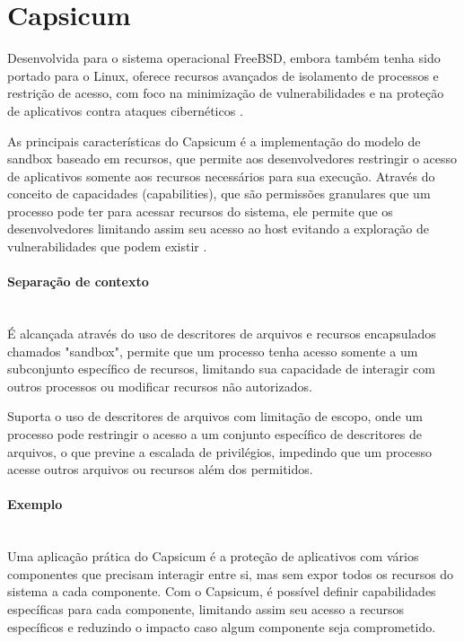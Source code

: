 \section{Capsicum}

Desenvolvida para o sistema operacional FreeBSD, embora também tenha sido portado para o Linux, oferece recursos avançados de isolamento de processos e restrição de acesso, com foco na minimização de vulnerabilidades e na proteção de aplicativos contra ataques cibernéticos \cite{freebsd-capsicum}.

As principais características do Capsicum é a implementação do modelo de sandbox baseado em recursos, que permite aos desenvolvedores restringir o acesso de aplicativos somente aos recursos necessários para sua execução. Através do conceito de capacidades (capabilities), que são permissões granulares que um processo pode ter para acessar recursos do sistema, ele permite que os desenvolvedores limitando assim seu acesso ao host evitando a exploração de vulnerabilidades que podem existir \cite{linux-security-redhat}.

\paragraph*{Separação de contexto}\mbox{}\\

É alcançada através do uso de descritores de arquivos e recursos encapsulados chamados "sandbox", permite que um processo tenha acesso somente a um subconjunto específico de recursos, limitando sua capacidade de interagir com outros processos ou modificar recursos não autorizados.

Suporta o uso de descritores de arquivos com limitação de escopo, onde um processo pode restringir o acesso a um conjunto específico de descritores de arquivos, o que previne a escalada de privilégios, impedindo que um processo acesse outros arquivos ou recursos além dos permitidos.

\paragraph*{Exemplo}\mbox{}\\

Uma aplicação prática do Capsicum é a proteção de aplicativos com vários componentes que precisam interagir entre si, mas sem expor todos os recursos do sistema a cada componente. Com o Capsicum, é possível definir capabilidades específicas para cada componente, limitando assim seu acesso a recursos específicos e reduzindo o impacto caso algum componente seja comprometido.
